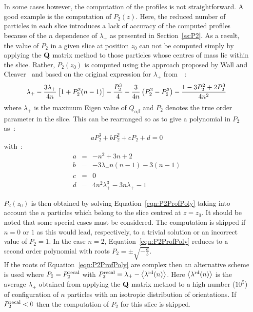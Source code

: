 In some cases however, the computation of the profiles is not straightforward. A good example
is the computation of $P_2(z)$. Here, the reduced number of particles in each slice
introduces a lack of accuracy of the computed profiles because of the $n$ dependence of
$\lambda_+$ 
as presented in Section~\ref{ss:P2}. As a result, the value of $P_2$ in a given slice at position $z_0$ 
can not be computed simply by applying the $\mathbf{Q}$ matrix method to those particles 
whose centres of mass lie within the slice. Rather, $P_2(z_0)$ is computed using the approach
proposed by Wall and Cleaver~\cite{WallCleaver97} and based on the original expression 
for $\lambda_+$ from~\cite{EppengaFrenkel84}~:
%
\begin{equation}
	\lambda_+ - \frac{3\lambda_+}{4n}\left[ 1 + P_2^2(n-1) \right] - \frac{P_2^3}{4}
	- \frac{3}{4n}\left( P_2^2 - P_2^3\right) - \frac{1-3P_2^2+2P_2^3}{4n^2}
\end{equation}
%
where $\lambda_+$ is the maximum Eigen value of $Q_{\alpha\beta}$ and $P_2$ denotes the true order
parameter in the slice. This can be rearranged so as to give a polynomial in $P_2$ as~:
%
\begin{equation}
	aP_2^3 + bP_2^2 + c P_2 + d = 0
	\label{eqn:P2ProfPoly}
\end{equation}
%
with~:
\begin{eqnarray*}
	a &=& -n^2 + 3n + 2			\\
	b &=& -3\lambda_+ n (n-1) - 3(n-1)	\\
	c &=& 0					\\
	d &=& 4n^2\lambda_+^3 - 3n\lambda_+ - 1
\end{eqnarray*}

$P_2(z_0)$ is then obtained by solving Equation~\ref{eqn:P2ProfPoly} taking into account the $n$
particles which belong to the slice centred at $z=z_0$. It should be noted that some special
cases must be considered. The computation is skipped if $n=0$ or $1$ as this would lead,
respectively, to a trivial solution or an incorrect value of $P_2=1$. In the case $n=2$,
Equation~\ref{eqn:P2ProfPoly} reduces to a second order polynomial with roots 
$P_2 = \pm\sqrt{-\frac{d}{b}}$.\\
%
If the roots of Equation~\ref{eqn:P2ProfPoly} are complex then an alternative scheme is 
used where $P_2 = P_2^{\mathrm{recal}}$ with $P_2^{\mathrm{recal}} = \lambda_+ - 
\left< \lambda^{\mathrm{rd}}(n)\right>$. Here $\left<\lambda^{\mathrm{rd}}(n)\right>$ is the average
$\lambda_+$ obtained from applying the $\mathbf{Q}$ matrix method to a high number (\eg $10^5$) of
configuration of $n$ particles with an isotropic distribution of orientations. If
$P_2^{\mathrm{recal}} < 0$ then the computation of $P_2$ for this slice is skipped.







